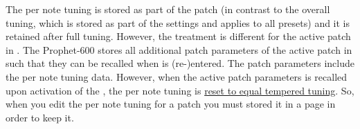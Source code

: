 The per note tuning is stored as part of the patch (in contrast to the overall tuning, which is stored as part of the settings and applies to all presets) and it is retained after full tuning. However, the treatment is different for the active patch in \livemode. The Prophet-600 stores all additional patch parameters of the active patch in \livemode such that they can be recalled when \livemode is (re-)entered. The patch parameters include the per note tuning data. However, when the active patch parameters is recalled upon activation of the \livemode, the per note tuning is \underline{reset to equal tempered tuning}. So, when you edit the per note tuning for a patch you must stored it in a page in order to keep it.
